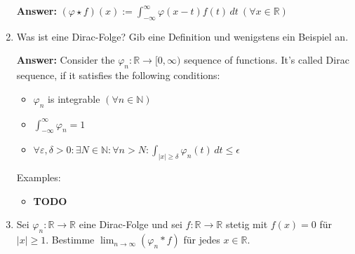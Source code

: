\documentclass[11pt]{article}
\newcommand{\abs}[1]{\left|#1\right|}
\newcommand{\RR}[0]{\mathbb{R}}
\newcommand{\NN}[0]{\mathbb{N}}
\begin{document}
\begin{enumerate}
    \textbf{Answer:} $(\varphi \star f)(x) := \int_{-\infty}^\infty \varphi(x-t) f(t)\,dt~(\forall x \in \RR)$
    \item Was ist eine Dirac-Folge? Gib eine Definition und wenigstens ein Beispiel an.

    \textbf{Answer:} Consider the $\varphi_n : \RR \to [0, \infty)$ sequence of functions. It's called Dirac sequence, if it satisfies the following conditions:
    \begin{itemize}
        \item $\varphi_n$ is integrable $(\forall n \in \NN)$
        \item $\int_{-\infty}^\infty \varphi_n = 1$
        \item $\forall \varepsilon, \delta > 0 \colon \exists N \in \NN\colon \forall n > N\colon \int_{\abs{x} \ge \delta} \varphi_n(t)\,dt \le \epsilon$
    \end{itemize}

    Examples:
    \begin{itemize}
        \item \textbf{TODO}
    \end{itemize}

    \item Sei $\varphi_n: \RR \to \RR$ eine Dirac-Folge und sei $f: \RR \to \RR$ stetig mit $f(x) = 0$ für $\abs{x} \ge 1$. Bestimme $\lim_{n\to\infty} (\varphi_n * f)$  für jedes $x \in \RR$.


\end{enumerate}
\end{document}
